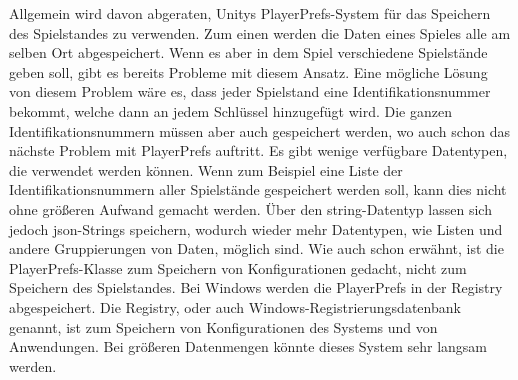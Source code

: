 Allgemein wird davon abgeraten, Unitys PlayerPrefs-System für das Speichern des Spielstandes zu verwenden.\cite{unityPersistentData}\cite{logrocketPlayerPrefs}\cite{gamedevbeginnerPlayerPrefs} Zum einen werden die Daten eines Spieles alle am selben Ort abgespeichert. Wenn es aber in dem Spiel verschiedene Spielstände geben soll, gibt es bereits Probleme mit diesem Ansatz. Eine mögliche Lösung von diesem Problem wäre es, dass jeder Spielstand eine Identifikationsnummer bekommt, welche dann an jedem Schlüssel hinzugefügt wird.\cite{logrocketPlayerPrefs} Die ganzen Identifikationsnummern müssen aber auch gespeichert werden, wo auch schon das nächste Problem mit PlayerPrefs auftritt. Es gibt wenige verfügbare Datentypen, die verwendet werden können. Wenn zum Beispiel eine Liste der Identifikationsnummern aller Spielstände gespeichert werden soll, kann dies nicht ohne größeren Aufwand gemacht werden.\cite{logrocketPlayerPrefs} Über den string-Datentyp lassen sich jedoch \ac{json}-Strings speichern, wodurch wieder mehr Datentypen, wie Listen und andere Gruppierungen von Daten, möglich sind. Wie auch schon erwähnt, ist die PlayerPrefs-Klasse zum Speichern von Konfigurationen gedacht, nicht zum Speichern des Spielstandes. Bei Windows werden die PlayerPrefs in der Registry abgespeichert. Die Registry, oder auch Windows-Registrierungsdatenbank genannt, ist zum Speichern von Konfigurationen des Systems und von Anwendungen.\cite{logrocketPlayerPrefs} Bei größeren Datenmengen könnte dieses System sehr langsam werden.\cite{gamedevbeginnerPlayerPrefs}


